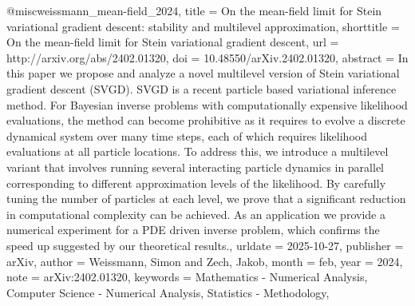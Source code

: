 @misc{weissmann_mean-field_2024,
	title = {On the mean-field limit for {Stein} variational gradient descent: stability and multilevel approximation},
	shorttitle = {On the mean-field limit for {Stein} variational gradient descent},
	url = {http://arxiv.org/abs/2402.01320},
	doi = {10.48550/arXiv.2402.01320},
	abstract = {In this paper we propose and analyze a novel multilevel version of Stein variational gradient descent (SVGD). SVGD is a recent particle based variational inference method. For Bayesian inverse problems with computationally expensive likelihood evaluations, the method can become prohibitive as it requires to evolve a discrete dynamical system over many time steps, each of which requires likelihood evaluations at all particle locations. To address this, we introduce a multilevel variant that involves running several interacting particle dynamics in parallel corresponding to different approximation levels of the likelihood. By carefully tuning the number of particles at each level, we prove that a significant reduction in computational complexity can be achieved. As an application we provide a numerical experiment for a PDE driven inverse problem, which confirms the speed up suggested by our theoretical results.},
	urldate = {2025-10-27},
	publisher = {arXiv},
	author = {Weissmann, Simon and Zech, Jakob},
	month = feb,
	year = {2024},
	note = {arXiv:2402.01320},
	keywords = {Mathematics - Numerical Analysis, Computer Science - Numerical Analysis, Statistics - Methodology},
}